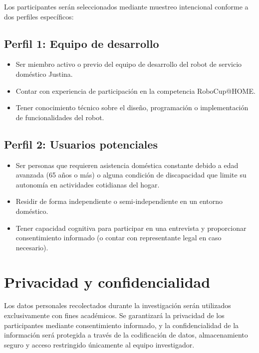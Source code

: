 Los participantes serán seleccionados mediante muestreo intencional conforme a dos perfiles específicos:

\subsection*{Perfil 1: Equipo de desarrollo}
\begin{itemize}
\item Ser miembro activo o previo del equipo de desarrollo del robot de servicio doméstico Justina.
\item Contar con experiencia de participación en la competencia RoboCup@HOME.
\item Tener conocimiento técnico sobre el diseño, programación o implementación de funcionalidades del robot.
\end{itemize}

\subsection*{Perfil 2: Usuarios potenciales}
\begin{itemize}
\item Ser personas que requieren asistencia doméstica constante debido a edad avanzada (65 años o más) o alguna condición de discapacidad que limite su autonomía en actividades cotidianas del hogar.
\item Residir de forma independiente o semi-independiente en un entorno doméstico.
\item Tener capacidad cognitiva para participar en una entrevista y proporcionar consentimiento informado (o contar con representante legal en caso necesario).
\end{itemize}

\section*{Privacidad y confidencialidad}
Los datos personales recolectados durante la investigación serán utilizados exclusivamente con fines académicos. Se garantizará la privacidad de los participantes mediante consentimiento informado, y la confidencialidad de la información será protegida a través de la codificación de datos, almacenamiento seguro y acceso restringido únicamente al equipo investigador.
